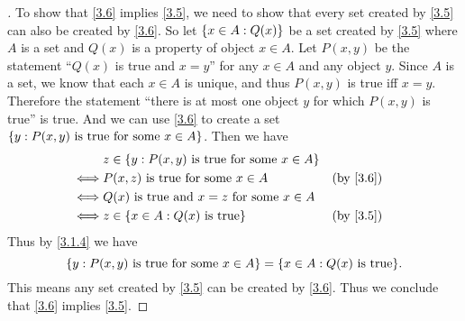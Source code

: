\begin{proof}[]
  To show that \cref{3.6} implies \cref{3.5}, we need to show that every set created by \cref{3.5} can also be created by \cref{3.6}.
  So let \(\left\lbrace x \in A : Q(x)\right\rbrace\) be a set created by \cref{3.5} where \(A\) is a set and \(Q(x)\) is a property of object \(x \in A\).
  Let \(P(x, y)\) be the statement ``\(Q(x)\) is true and \(x = y\)'' for any \(x \in A\) and any object \(y\).
  Since \(A\) is a set, we know that each \(x \in A\) is unique, and thus \(P(x, y)\) is true iff \(x = y\).
  Therefore the statement ``there is at most one object \(y\) for which \(P(x, y)\) is true'' is true.
  And we can use \cref{3.6} to create a set \(\left\lbrace y : P(x, y) \text{ is true for some } x \in A\right\rbrace\).
  Then we have
  \begin{align*}
         & z \in \set{y : P(x, y) \text{ is true for some } x \in A}               \\
    \iff & P(x, z) \text{ is true for some } x \in A                 &  & \by{3.6} \\
    \iff & Q(x) \text{ is true and } x = z \text{ for some } x \in A               \\
    \iff & z \in \set{x \in A : Q(x) \text{ is true}}                &  & \by{3.5}
  \end{align*}
  Thus by \cref{3.1.4} we have
  \[
    \set{y : P(x, y) \text{ is true for some } x \in A} = \set{x \in A : Q(x) \text{ is true}}.
  \]
  This means any set created by \cref{3.5} can be created by \cref{3.6}.
  Thus we conclude that \cref{3.6} implies \cref{3.5}.
\end{proof}

